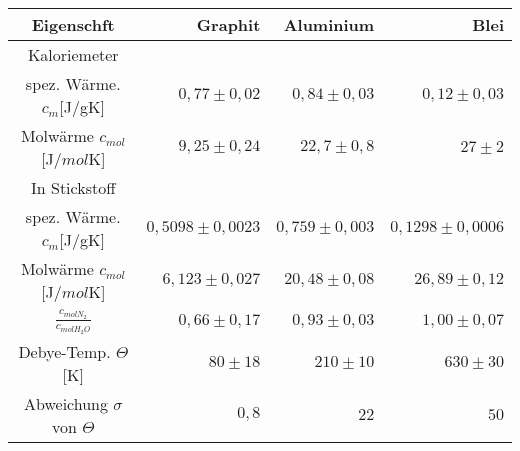 \begin{table}[h!]
    \centering
    \begin{tabular}{c|r r r}
        \toprule
        Eigenschft & Graphit & Aluminium & Blei \\
        \midrule
        Kaloriemeter \\
        spez. Wärme. $c_m$[J/gK] & $ 0,77 \pm 0,02$ & $0,84 \pm 0,03$ & $0,12 \pm 0,03$ \\
        Molwärme    $c_{mol}$[J/$mol$K] &$ 9,25\pm 0,24$ & $22,7 \pm 0,8$ & $27 \pm2 $\\
        \midrule
        In Stickstoff \\
        spez. Wärme. $c_m$[J/gK] &$ 0,5098 \pm 0,0023 $& $0,759 \pm 0,003 $& $0,1298 \pm 0,0006 $\\
        Molwärme   $c_{mol}$[J/$mol$K]& $6,123 \pm 0,027$& $20,48 \pm 0,08$&$ 26,89 \pm 0,12$\\
        \midrule
        $\frac{c_{molN_2}}{c_{molH_2O}}$ &$0,66 \pm 0,17 $& $0,93 \pm 0,03$ &$ 1,00 \pm 0,07$\\
        Debye-Temp. $\Theta$[K] & $80 \pm 18$ & $210 \pm 10$ & $630 \pm 30$\\
        Abweichung $\sigma$ von $\Theta$  & $0,8$ & $22$ & $50$ \\

        
    \end{tabular}
\end{table}
\clearpage
\newpage
\mbox{~}
\clearpage
\newpage